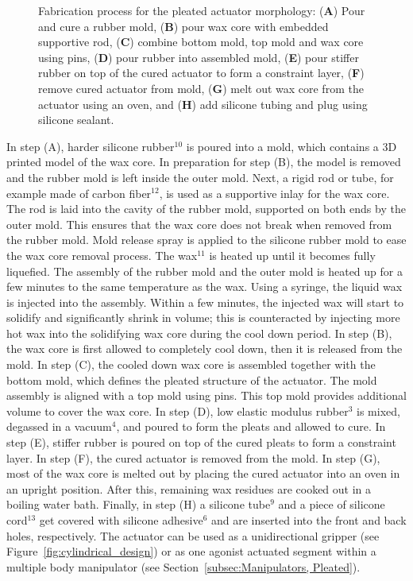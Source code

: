 \begin{figure}[htb]
      \caption[Fabrication process for the pleated actuator morphology]{Fabrication process for the pleated actuator morphology: (\textbf{A}) Pour and cure a rubber mold, (\textbf{B}) pour wax core with embedded supportive rod, (\textbf{C}) combine bottom mold, top mold and wax core using pins, (\textbf{D}) pour rubber into assembled mold, (\textbf{E}) pour stiffer rubber on top of the cured actuator to form a constraint layer, (\textbf{F}) remove cured actuator from mold, (\textbf{G}) melt out wax core from the actuator using an oven, and (\textbf{H}) add silicone tubing and plug using silicone sealant.}
      \label{fig:pleated_fab}
\end{figure}
In step (A), harder silicone rubber$^{10}$ is poured into a mold, which contains a 3D printed model of the wax core.
In preparation for step (B), the model is removed and the rubber mold is left inside the outer mold.
Next, a rigid rod or tube, for example made of carbon fiber$^{12}$, is used as a supportive inlay for the wax core.
The rod is laid into the cavity of the rubber mold, supported on both ends by the outer mold.
This ensures that the wax core does not break when removed from the rubber mold.
Mold release spray is applied to the silicone rubber mold to ease the wax core removal process.
The wax$^{11}$ is heated up until it becomes fully liquefied.
The assembly of the rubber mold and the outer mold is heated up for a few minutes to the same temperature as the wax.
Using a syringe, the liquid wax is injected into the assembly.
Within a few minutes, the injected wax will start to solidify and significantly shrink in volume; this is counteracted by injecting more hot wax into the solidifying wax core during the cool down period.
In step (B), the wax core is first allowed to completely cool down, then it is released from the mold.
In step (C), the cooled down wax core is assembled together with the bottom mold, which defines the pleated structure of the actuator.
The mold assembly is aligned with a top mold using pins. This top mold provides additional volume to cover the wax core.
In step (D), low elastic modulus rubber$^3$ is mixed, degassed in a vacuum$^4$, and poured to form the pleats and allowed to cure.
In step (E), stiffer rubber is poured on top of the cured pleats to form a constraint layer.
In step (F), the cured actuator is removed from the mold.
In step (G), most of the wax core is melted out by placing the cured actuator into an oven in an upright position.
After this, remaining wax residues are cooked out in a boiling water bath.
Finally, in step (H) a silicone tube$^9$ and a piece of silicone cord$^13$ get covered with silicone adhesive$^6$ and are inserted into the front and back holes, respectively.
The actuator can be used as a unidirectional gripper (see Figure~\ref{fig:cylindrical_design}) or as one agonist actuated segment within a multiple body manipulator (see Section~\ref{subsec:Manipulators, Pleated}).


